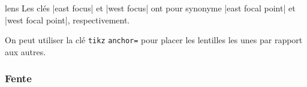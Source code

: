 \documentclass[a4paper]{ltxdoc}
\begin{document}
\begin{shape}{lens}
Les clés |east focus| et |west focus| ont pour synonyme |east focal point| et |west focal point|, respectivement.


On peut utiliser la clé \texttt{tikz} \texttt{anchor=} pour placer les lentilles les unes par rapport aux autres.

\begin{codeexample}[width=6cm]
\end{codeexample}

\end{shape}

\subsubsection{Fente}
\end{document}
